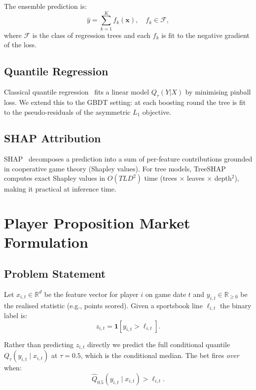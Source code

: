 \documentclass[conference]{IEEEtran}
\begin{document}
The ensemble prediction is:
\begin{equation}
  \hat{y} = \sum_{k=1}^{K} f_k(\mathbf{x}),\quad f_k \in \mathcal{F},
\label{eq:gbm}
\end{equation}
where $\mathcal{F}$ is the class of regression trees and each $f_k$ is
fit to the negative gradient of the loss.

\subsection{Quantile Regression}

Classical quantile regression~\cite{koenker1978} fits a linear model
$Q_\tau(Y|X)$ by minimising pinball loss.  We extend this to the GBDT
setting: at each boosting round the tree is fit to the pseudo-residuals of
the asymmetric $L_1$ objective.

\subsection{SHAP Attribution}

SHAP~\cite{lundberg2018} decomposes a prediction into a sum of per-feature
contributions grounded in cooperative game theory (Shapley values).
For tree models, TreeSHAP computes exact Shapley values in $O(TLD^2)$
time (trees $\times$ leaves $\times$ depth$^2$), making it practical
at inference time.

\section{Player Proposition Market Formulation}
\label{sec:props}

\subsection{Problem Statement}

Let $x_{i,t} \in \mathbb{R}^d$ be the feature vector for player $i$
on game date $t$ and $y_{i,t} \in \mathbb{R}_{\ge 0}$ be the realised
statistic (e.g., points scored).  Given a sportsbook line $\ell_{i,t}$
the binary label is:
\begin{equation}
  z_{i,t} = \mathbf{1}[y_{i,t} > \ell_{i,t}].
\label{eq:label}
\end{equation}

Rather than predicting $z_{i,t}$ directly we predict the full conditional
quantile $Q_\tau(y_{i,t} \mid x_{i,t})$ at $\tau = 0.5$, which is the
conditional median.  The bet fires \emph{over} when:
\begin{equation}
  \hat{Q}_{0.5}(y_{i,t} \mid x_{i,t}) > \ell_{i,t}.
\label{eq:bet}
\end{equation}
\end{document}
